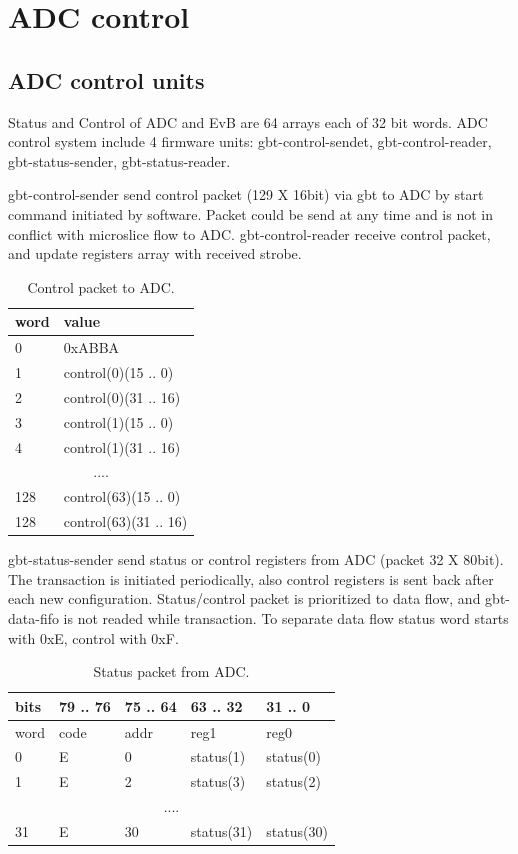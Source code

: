 \documentclass{article}
\begin{document}
\section{ADC control}
\subsection{ADC control units}
Status and Control of ADC and EvB are 64 arrays each of 32 bit words.
ADC control system include 4 firmware units: gbt-control-sendet, gbt-control-reader, gbt-status-sender, gbt-status-reader.

gbt-control-sender send control packet (129 X 16bit) via gbt to ADC by start command initiated by software. Packet could be send at any time and is not in conflict with microslice flow to ADC. gbt-control-reader receive control packet, and update registers array with received strobe.


\begin{table}[H]
\centering
\begin{tabular}{| l | l |}
\hline
word & value \\ \hline
0 & 0xABBA \\ \hline
1 & control(0)(15 .. 0) \\ \hline
2 & control(0)(31 .. 16) \\ \hline
3 & control(1)(15 .. 0) \\ \hline
4 & control(1)(31 .. 16) \\ \hline
\multicolumn{2}{|c|}{....} \\ \hline
128 & control(63)(15 .. 0) \\ \hline
128 & control(63)(31 .. 16) \\ \hline
\end{tabular}
\caption{Control packet to ADC.\label{tab4}}
\end{table}


gbt-status-sender send status or control registers from ADC (packet 32 X 80bit). The transaction is initiated periodically, also control registers is sent back after each new configuration. Status/control packet is prioritized to data flow, and gbt-data-fifo is not readed while transaction. To separate data flow status word starts with 0xE, control with 0xF. 


\begin{table}[H]
\centering
\begin{tabular}{| l | l | l | l | l |}
\hline
 bits & 79 .. 76 & 75 .. 64 & 63 .. 32 & 31 .. 0 \\ \hline
word & code & addr & reg1 & reg0 \\ \hline
0 & E & 0 & status(1) & status(0) \\ \hline
1 & E & 2 & status(3) & status(2) \\ \hline
\multicolumn{5}{|c|}{....} \\ \hline
31 & E & 30 & status(31) & status(30) \\ \hline
\end{tabular}
\caption{Status packet from ADC.\label{tab4}}
\end{table}
\end{document}
